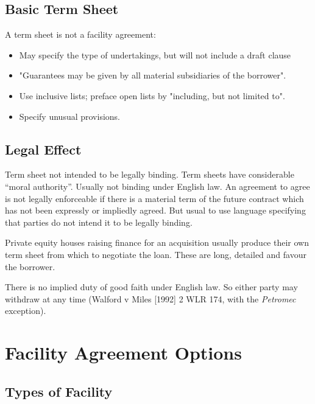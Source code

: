 \documentclass[
]{article}
\providecommand{\tightlist}{%
  \setlength{\itemsep}{0pt}\setlength{\parskip}{0pt}}
\begin{document}
\hypertarget{basic-term-sheet}{%
\subsection{Basic Term Sheet}\label{basic-term-sheet}}

A term sheet is not a facility agreement:

\begin{itemize}
\tightlist
\item
  May specify the type of undertakings, but will not include a draft
  clause
\item
  "Guarantees may be given by all material subsidiaries of the
  borrower".
\item
  Use inclusive lists; preface open lists by "including, but not limited
  to".
\item
  Specify unusual provisions.
\end{itemize}

\hypertarget{legal-effect}{%
\subsection{Legal Effect}\label{legal-effect}}

Term sheet not intended to be legally binding. Term sheets have
considerable ``moral authority''. Usually not binding under English law.
An agreement to agree is not legally enforceable if there is a material
term of the future contract which has not been expressly or impliedly
agreed. But usual to use language specifying that parties do not intend
it to be legally binding.

Private equity houses raising finance for an acquisition usually produce
their own term sheet from which to negotiate the loan. These are long,
detailed and favour the borrower.

There is no implied duty of good faith under English law. So either
party may withdraw at any time (Walford v Miles {[}1992{]} 2 WLR 174,
with the \emph{Petromec} exception).

\hypertarget{facility-agreement-options}{%
\section{Facility Agreement Options}\label{facility-agreement-options}}

\hypertarget{types-of-facility}{%
\subsection{Types of Facility}\label{types-of-facility}}
\end{document}
